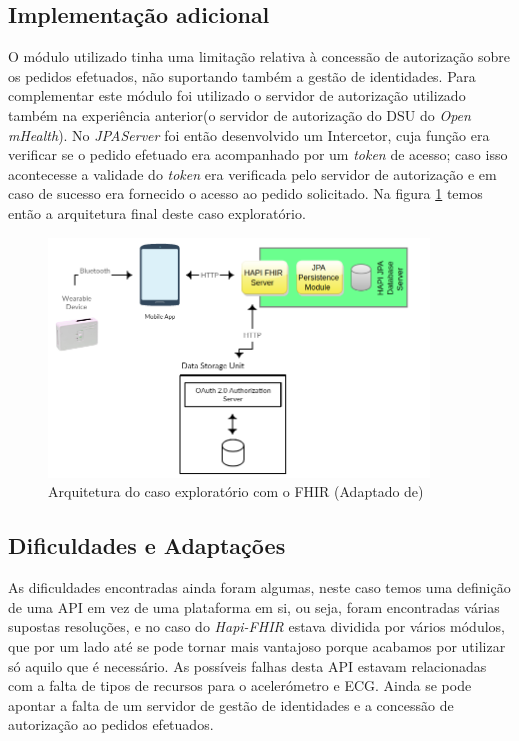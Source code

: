 \subsection{Implementação adicional}
O módulo utilizado tinha uma limitação relativa à concessão de autorização sobre os pedidos efetuados, não suportando também a gestão de identidades. Para complementar este módulo foi utilizado o servidor de autorização utilizado também na experiência anterior(o servidor de autorização do \gls{DSU} do \textit{Open mHealth}).
No \textit{JPAServer} foi então desenvolvido um Intercetor, cuja função era verificar se o pedido efetuado era acompanhado por um \textit{token} de acesso; caso isso acontecesse a validade do \textit{token} era verificada pelo servidor de autorização e em caso de sucesso era fornecido o acesso ao pedido solicitado. Na figura \ref{f:exp-fhir-arch} temos então a arquitetura final deste caso exploratório.
\begin{figure}[H]
  \centering
  \includegraphics[width=0.9\textwidth]{imgs/fhir-arch-exp.png}
  \caption[Arquitetura do caso exploratório com o FHIR]{Arquitetura do caso exploratório com o FHIR (Adaptado de)\cite{hapi-index}}
  
  \label{f:exp-fhir-arch}
\end{figure}

\subsection{Dificuldades e Adaptações}
As dificuldades encontradas ainda foram algumas, neste caso temos uma definição de uma \gls{API} em vez de uma plataforma em si, ou seja, foram encontradas várias supostas resoluções, e no caso do \textit{Hapi-FHIR} estava dividida por vários módulos, que por um lado até se pode tornar mais vantajoso porque acabamos por utilizar só aquilo que é necessário. As possíveis falhas desta \gls{API} estavam relacionadas com a falta de tipos de recursos para o acelerómetro e \gls{ECG}. Ainda se pode apontar a falta de um servidor de gestão de identidades e a concessão de autorização ao pedidos efetuados.

